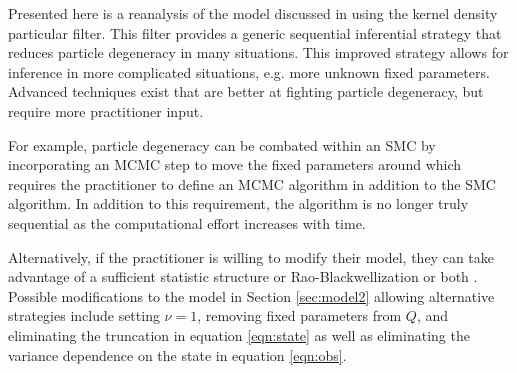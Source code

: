 
Presented here is a reanalysis of the model discussed in \citet{skvortsov2012monitoring} using the kernel density particular filter. This filter provides a generic sequential inferential strategy that reduces particle degeneracy in many situations. This improved strategy allows for inference in more complicated situations, e.g. more unknown fixed parameters. Advanced techniques exist that are better at fighting particle degeneracy, but require more practitioner input. 

For example, particle degeneracy can be combated within an SMC by incorporating an MCMC step to move the fixed parameters around \citep{Gilk:Berz:foll:2001,Stor:part:2002} which requires the practitioner to define an MCMC algorithm in addition to the SMC algorithm. In addition to this requirement, the algorithm is no longer truly sequential as the computational effort increases with time. 

Alternatively, if the practitioner is willing to modify their model, they can take advantage of a sufficient statistic structure \citep{Fear:mark:2002} or Rao-Blackwellization \citep{Douc:Gods:Andr:on:2000} or both \citep{carvalho2010particle}. Possible modifications to the model in Section \ref{sec:model2} allowing alternative strategies include setting $\nu=1$, removing fixed parameters from $Q$, and eliminating the truncation in equation \eqref{eqn:state} as well as eliminating the variance dependence on the state in equation \eqref{eqn:obs}. 


